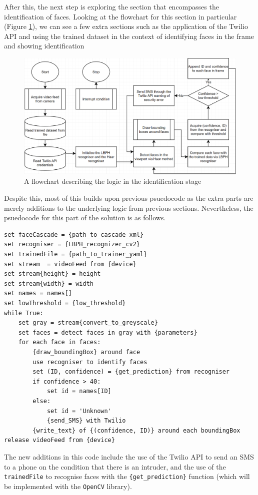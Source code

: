 \documentclass[9pt]{article}
\begin{document}
After this, the next step is exploring the section that encompasses the identification of faces. Looking at the flowchart for this section in particular (Figure \ref{fig_flowRecognition}), we can see a few extra sections such as the application of the Twilio API and using the trained dataset in the context of identifying faces in the frame and showing identification
\begin{figure}[H]
	\centering
	\includegraphics[width=4.7in]{facialRecognitionIdentify.png}
	\caption{A flowchart describing the logic in the identification stage}\label{fig_flowRecognition}
\end{figure}
Despite this, most of this builds upon previous psuedocode as the extra parts are merely additions to the underlying logic from previous sections. Nevertheless, the psuedocode for this part of the solution is as follows.
\begin{lstlisting}
set faceCascade = {path_to_cascade_xml}
set recogniser = {LBPH_recognizer_cv2}
set trainedFile = {path_to_trainer_yaml} 
set stream 	= videoFeed from {device}
set stream{height} = height
set stream{width} = width
set names = names[]
set lowThreshold = {low_threshold}
while True:
	set gray = stream{convert_to_greyscale}
	set faces = detect faces in gray with {parameters}
	for each face in faces:
		{draw_boundingBox} around face
		use recogniser to identify faces
		set (ID, confidence) = {get_prediction} from recogniser
		if confidence > 40:
			set id = names[ID]
		else:
			set id = 'Unknown'
			{send_SMS} with Twilio
		{write_text} of {(confidence, ID)} around each boundingBox
release videoFeed from {device}
\end{lstlisting}
The new additions in this code include the use of the Twilio API to send an SMS to a phone on the condition that there is an intruder, and the use of the \texttt{trainedFile} to recognise faces with the \texttt{\{get\_prediction\}} function (which will be implemented with the \texttt{OpenCV} library).
\end{document}
